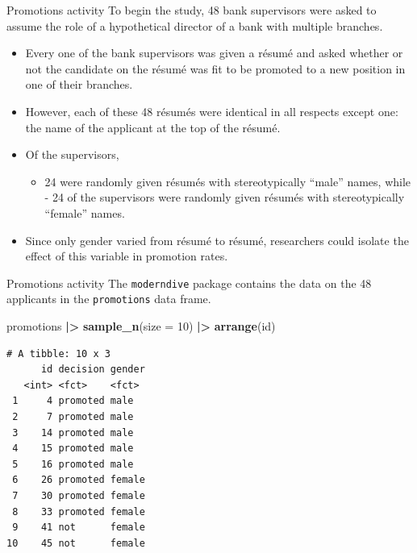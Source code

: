 \documentclass[
  ignorenonframetext,
]{beamer}
\newenvironment{Shaded}{\begin{snugshade}}{\end{snugshade}}
\newcommand{\AttributeTok}[1]{\textcolor[rgb]{0.13,0.29,0.53}{#1}}
\newcommand{\DecValTok}[1]{\textcolor[rgb]{0.00,0.00,0.81}{#1}}
\newcommand{\FunctionTok}[1]{\textcolor[rgb]{0.13,0.29,0.53}{\textbf{#1}}}
\newcommand{\NormalTok}[1]{#1}
\newcommand{\SpecialCharTok}[1]{\textcolor[rgb]{0.81,0.36,0.00}{\textbf{#1}}}
\providecommand{\tightlist}{%
  \setlength{\itemsep}{0pt}\setlength{\parskip}{0pt}}
\begin{document}
\begin{frame}{Promotions activity}
\label{promotions-activity-1}
To begin the study, 48 bank supervisors were asked to assume the role of
a hypothetical director of a bank with multiple branches.

\begin{itemize}
\item
  Every one of the bank supervisors was given a résumé and asked whether
  or not the candidate on the résumé was fit to be promoted to a new
  position in one of their branches.
\item
  However, each of these 48 résumés were identical in all respects
  except one: the name of the applicant at the top of the résumé.
\item
  Of the supervisors,

  \begin{itemize}
  \tightlist
  \item
    24 were randomly given résumés with stereotypically ``male'' names,
    while - 24 of the supervisors were randomly given résumés with
    stereotypically ``female'' names.
  \end{itemize}
\item
  Since only gender varied from résumé to résumé, researchers could
  isolate the effect of this variable in promotion rates.
\end{itemize}
\end{frame}

\begin{frame}[fragile]{Promotions activity}
\label{promotions-activity-2}
The \texttt{moderndive} package contains the data on the 48 applicants
in the \texttt{promotions} data frame.

\tiny

\begin{Shaded}
\begin{Highlighting}[]
\NormalTok{promotions }\SpecialCharTok{|\textgreater{}} 
  \FunctionTok{sample\_n}\NormalTok{(}\AttributeTok{size =} \DecValTok{10}\NormalTok{) }\SpecialCharTok{|\textgreater{}} 
  \FunctionTok{arrange}\NormalTok{(id)}
\end{Highlighting}
\end{Shaded}

\begin{verbatim}
# A tibble: 10 x 3
      id decision gender
   <int> <fct>    <fct> 
 1     4 promoted male  
 2     7 promoted male  
 3    14 promoted male  
 4    15 promoted male  
 5    16 promoted male  
 6    26 promoted female
 7    30 promoted female
 8    33 promoted female
 9    41 not      female
10    45 not      female
\end{verbatim}

\normalsize
\end{frame}
\end{document}
